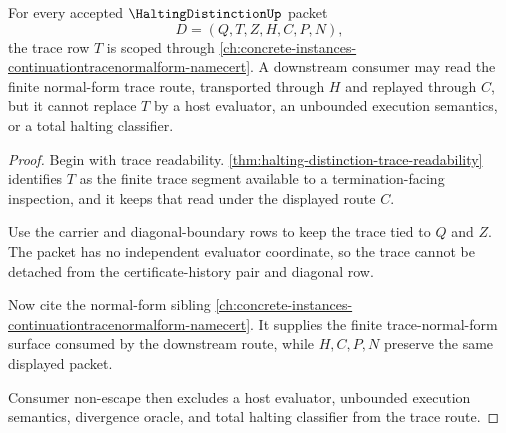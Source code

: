 \begin{theorem}
\label{thm:halting-distinction-trace-normal-form-scope}
For every accepted $\HaltingDistinctionUp$ packet
$$
D=(Q,T,Z,H,C,P,N),
$$
the trace row $T$ is scoped through \autoref{ch:concrete-instances-continuationtracenormalform-namecert}. A downstream consumer may read the finite normal-form trace route, transported through $H$ and replayed through $C$, but it cannot replace $T$ by a host evaluator, an unbounded execution semantics, or a total halting classifier.
\end{theorem}
\begin{proof}
Begin with trace readability. \autoref{thm:halting-distinction-trace-readability} identifies $T$ as the finite trace segment available to a termination-facing inspection, and it keeps that read under the displayed route $C$.

Use the carrier and diagonal-boundary rows to keep the trace tied to $Q$ and $Z$. The packet has no independent evaluator coordinate, so the trace cannot be detached from the certificate-history pair and diagonal row.

Now cite the normal-form sibling \autoref{ch:concrete-instances-continuationtracenormalform-namecert}. It supplies the finite trace-normal-form surface consumed by the downstream route, while $H,C,P,N$ preserve the same displayed packet.

Consumer non-escape then excludes a host evaluator, unbounded execution semantics, divergence oracle, and total halting classifier from the trace route.
\end{proof}


